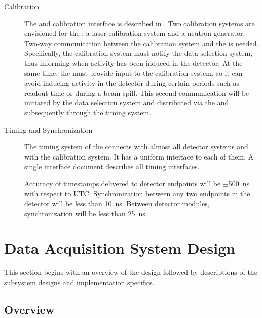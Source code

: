 \begin{description}
\item[Calibration] The  and calibration interface is described in . 
Two calibration systems are envisioned for the : a laser calibration system and a neutron generator. 
  Two-way communication between the calibration system and the
   is needed.  Specifically, the calibration system must
  notify the data selection system, thus informing 
  when activity has been induced in the detector. At the same time, 
the  must provide input to the calibration system, so it can avoid inducing activity in 
the detector during certain periods such as  readout time or during a beam spill.
This second communication will be initiated by the data selection
system and distributed via the  and
subsequently through the
 timing system.

\item[Timing and Synchronization] The timing system of the  
 connects with almost all detector systems and with the calibration 
system.  It has a uniform interface to each of them. 
  A single interface document  describes all timing interfaces. 

Accuracy of timestamps delivered to  detector endpoints will be 
$\pm$\SI{500}{\nano\second} with respect to UTC. 
Synchronization between any two endpoints in the detector will be less than 
\SI{10}{\nano\second}. Between detector modules, synchronization will be less than \SI{25}{\nano\second}.  
\end{description}

\section{Data Acquisition System Design}
\label{sec:daq:design}

This section begins with an overview of the 
design followed by
descriptions of the subsystem designs and implementation specifics.

\subsection{Overview}
\label{sec:daq:design-overview}

